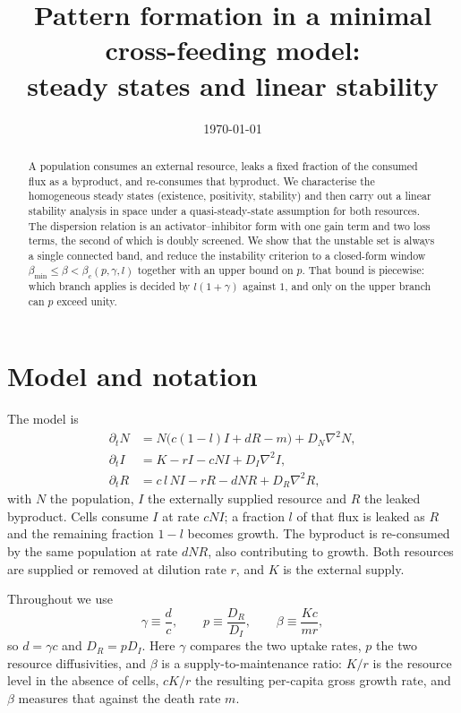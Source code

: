 \documentclass[11pt,a4paper]{article}
\title{Pattern formation in a minimal cross-feeding model:\\
steady states and linear stability}
\author{}
\date{\today}
\theoremstyle{plain}
\theoremstyle{remark}
\begin{document}
\maketitle

\begin{abstract}
\noindent
A population consumes an external resource, leaks a fixed fraction of the
consumed flux as a byproduct, and re-consumes that byproduct. We characterise
the homogeneous steady states (existence, positivity, stability) and then carry
out a linear stability analysis in space under a quasi-steady-state assumption
for both resources. The dispersion relation is an activator--inhibitor form with
one gain term and two loss terms, the second of which is doubly screened. We
show that the unstable set is always a single connected band, and reduce the
instability criterion to a closed-form window
$\beta_{\min}\le\beta<\beta_c(p,\gamma,l)$ together with an upper bound on $p$.
That bound is piecewise: which branch applies is decided by $l(1+\gamma)$
against $1$, and only on the upper branch can $p$ exceed unity.
\end{abstract}

\section{Model and notation}

The model is
\begin{align}
\partial_t N &= N\bigl(c(1-l)I + dR - m\bigr) + D_N\nabla^2 N, \label{eq:N}\\
\partial_t I &= K - rI - cNI + D_I\nabla^2 I, \label{eq:I}\\
\partial_t R &= c\,l\,NI - rR - dNR + D_R\nabla^2 R, \label{eq:R}
\end{align}
with $N$ the population, $I$ the externally supplied resource and $R$ the leaked
byproduct. Cells consume $I$ at rate $cNI$; a fraction $l$ of that flux is
leaked as $R$ and the remaining fraction $1-l$ becomes growth. The byproduct is
re-consumed by the same population at rate $dNR$, also contributing to growth.
Both resources are supplied or removed at dilution rate $r$, and $K$ is the
external supply.

Throughout we use
\begin{equation}
\gamma \equiv \frac{d}{c},\qquad
p \equiv \frac{D_R}{D_I},\qquad
\beta \equiv \frac{Kc}{mr},
\end{equation}
so $d=\gamma c$ and $D_R = pD_I$. Here $\gamma$ compares the two uptake rates,
$p$ the two resource diffusivities, and $\beta$ is a supply-to-maintenance
ratio: $K/r$ is the resource level in the absence of cells, $cK/r$ the resulting
per-capita gross growth rate, and $\beta$ measures that against the death rate
$m$.
\end{document}
